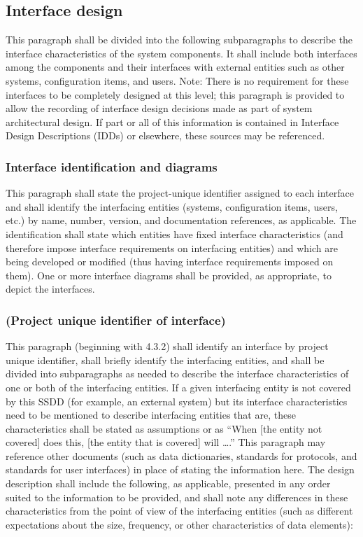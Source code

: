 \documentclass{fidata-report-template}
\begin{document}
\subsection{Interface design}

This paragraph shall be divided into the following subparagraphs to
describe the interface characteristics of the system components. It
shall include both interfaces among the components and their interfaces
with external entities such as other systems, configuration items, and
users. Note: There is no requirement for these interfaces to be
completely designed at this level; this paragraph is provided to allow
the recording of interface design decisions made as part of system
architectural design. If part or all of this information is contained in
Interface Design Descriptions (IDDs) or elsewhere, these sources may be
referenced.

\subsubsection{Interface identification and diagrams}

This paragraph shall state the project-unique identifier assigned to
each interface and shall identify the interfacing entities (systems,
configuration items, users, etc.) by name, number, version, and
documentation references, as applicable. The identification shall state
which entities have fixed interface characteristics (and therefore
impose interface requirements on interfacing entities) and which are
being developed or modified (thus having interface requirements imposed
on them). One or more interface diagrams shall be provided, as
appropriate, to depict the interfaces.

\subsubsection{(Project unique identifier of interface)}

This paragraph (beginning with 4.3.2) shall identify an interface by
project unique identifier, shall briefly identify the interfacing
entities, and shall be divided into subparagraphs as needed to describe
the interface characteristics of one or both of the interfacing
entities. If a given interfacing entity is not covered by this SSDD (for
example, an external system) but its interface characteristics need to
be mentioned to describe interfacing entities that are, these
characteristics shall be stated as assumptions or as ``When {[}the
entity not covered{]} does this, {[}the entity that is covered{]} will
\ldots{}.'' This paragraph may reference other documents (such as data
dictionaries, standards for protocols, and standards for user
interfaces) in place of stating the information here. The design
description shall include the following, as applicable, presented in any
order suited to the information to be provided, and shall note any
differences in these characteristics from the point of view of the
interfacing entities (such as different expectations about the size,
frequency, or other characteristics of data elements):
\end{document}
